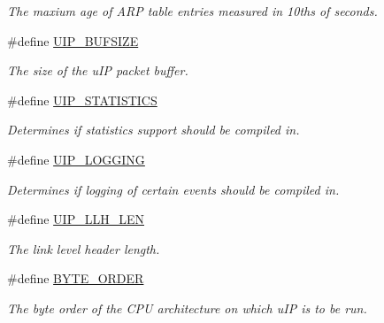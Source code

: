 \begin{CompactItemize}
\begin{CompactList}\small\item\em The maxium age of ARP table entries measured in 10ths of seconds. \item\end{CompactList}\item 
\#define \hyperlink{a00076_g3589822ecb9d9c4145209756396b8a6b}{UIP\_\-BUFSIZE}
\begin{CompactList}\small\item\em The size of the u\-IP packet buffer. \item\end{CompactList}\item 
\#define \hyperlink{a00076_g5726142fec34f35fb9ea19e5a45975c6}{UIP\_\-STATISTICS}
\begin{CompactList}\small\item\em Determines if statistics support should be compiled in. \item\end{CompactList}\item 
\#define \hyperlink{a00076_g21664b7441cfa37d280228d23316d609}{UIP\_\-LOGGING}
\begin{CompactList}\small\item\em Determines if logging of certain events should be compiled in. \item\end{CompactList}\item 
\#define \hyperlink{a00076_ge6f4a2453dbd8bc60e6a82774552366a}{UIP\_\-LLH\_\-LEN}
\begin{CompactList}\small\item\em The link level header length. \item\end{CompactList}\item 
\#define \hyperlink{a00077_g1771b7fb65ee640524d0052f229768c3}{BYTE\_\-ORDER}
\begin{CompactList}\small\item\em The byte order of the CPU architecture on which u\-IP is to be run. \item\end{CompactList}\end{CompactItemize}
